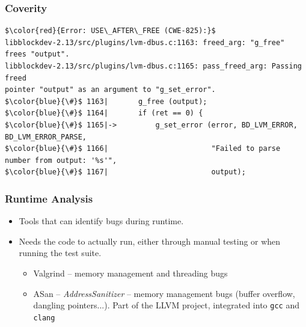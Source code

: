 \documentclass[aspectratio=169]{beamer}
\begin{document}
\begin{frame}[fragile]
	\frametitle{Coverity}
\begin{lstlisting}[frame=none, basicstyle=\ttfamily\small, escapechar=$, columns=fullflexible, keepspaces=true]
$\color{red}{Error: USE\_AFTER\_FREE (CWE-825):}$
libblockdev-2.13/src/plugins/lvm-dbus.c:1163: freed_arg: "g_free" 
frees "output".
libblockdev-2.13/src/plugins/lvm-dbus.c:1165: pass_freed_arg: Passing freed 
pointer "output" as an argument to "g_set_error".
$\color{blue}{\#}$ 1163|       g_free (output);
$\color{blue}{\#}$ 1164|       if (ret == 0) {
$\color{blue}{\#}$ 1165|->         g_set_error (error, BD_LVM_ERROR, BD_LVM_ERROR_PARSE,
$\color{blue}{\#}$ 1166|                        "Failed to parse number from output: '%s'",
$\color{blue}{\#}$ 1167|                        output);
\end{lstlisting}

\end{frame}

\begin{frame}
	\frametitle{Runtime Analysis}

	\begin{block}{}
		\begin{itemize}
			\item Tools that can identify bugs during runtime.
			\item Needs the code to actually run, either through manual testing or when running the test suite.
				\begin{itemize}
					\item Valgrind -- memory management and threading bugs\footnotemark
					\item ASan -- \emph{AddressSanitizer} -- memory management bugs (buffer overflow, dangling pointers...). Part of the LLVM project, integrated into \texttt{gcc} and \texttt{clang}\footnotemark
				\end{itemize}
		\end{itemize}
	\end{block}


\end{frame}
\end{document}
